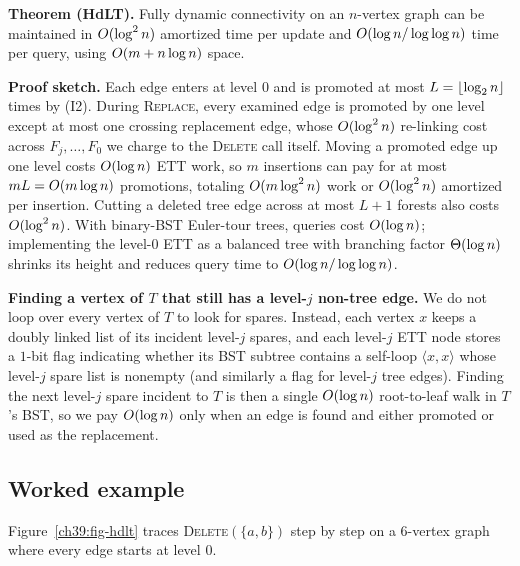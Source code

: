 \begin{formalbox}
\textbf{Theorem (HdLT).} Fully dynamic connectivity on an $n$-vertex graph can be
maintained in $O(\log^2 n)$ amortized time per update and $O(\log n / \log\log n)$
time per query, using $O(m+n\log n)$ space.

\textbf{Proof sketch.} Each edge enters at level $0$ and is promoted at most
$L = \lfloor\log_2 n\rfloor$ times by (I2). During \textsc{Replace}, every examined edge is
promoted by one level except at most one crossing replacement edge, whose $O(\log^2 n)$
re-linking cost across $F_j,\dots,F_0$ we charge to the \textsc{Delete} call itself.
Moving a promoted edge up one level costs $O(\log n)$ ETT work, so $m$ insertions can
pay for at most $mL = O(m\log n)$ promotions, totaling $O(m\log^2 n)$ work or
$O(\log^2 n)$ amortized per insertion. Cutting a deleted tree edge across at most
$L+1$ forests also costs $O(\log^2 n)$. With binary-BST Euler-tour trees, queries cost
$O(\log n)$; implementing the level-$0$ ETT as a balanced tree with branching factor
$\Theta(\log n)$ shrinks its height and reduces query time to $O(\log n / \log\log n)$.
\end{formalbox}

\begin{whybox}
\textbf{Finding a vertex of $T$ that still has a level-$j$ non-tree edge.}
We do not loop over every vertex of $T$ to look for spares. Instead, each vertex $x$
keeps a doubly linked list of its incident level-$j$ spares, and each level-$j$ ETT node
stores a $1$-bit flag indicating whether its BST subtree contains a self-loop
$\langle x,x\rangle$ whose level-$j$ spare list is nonempty (and similarly a flag for
level-$j$ tree edges). Finding the next level-$j$ spare incident to $T$ is then a single
$O(\log n)$ root-to-leaf walk in $T$'s BST, so we pay $O(\log n)$ only when an edge
is found and either promoted or used as the replacement.
\end{whybox}

\subsection*{Worked example}

Figure~\ref{ch39:fig-hdlt} traces \textsc{Delete}$(\{a,b\})$ step by step on a
$6$-vertex graph where every edge starts at level $0$.

